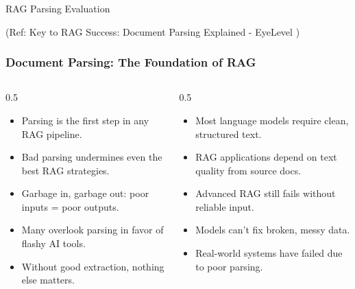 \begin{frame}[fragile]\frametitle{}
\begin{center}
{\Large RAG Parsing Evaluation}

{\tiny (Ref: Key to RAG Success: Document Parsing Explained - EyeLevel )}
\end{center}
\end{frame}

\begin{frame}[fragile]\frametitle{Document Parsing: The Foundation of RAG}

\begin{columns}
    \begin{column}[T]{0.5\linewidth}
	  \begin{itemize}
		\item Parsing is the first step in any RAG pipeline.
		\item Bad parsing undermines even the best RAG strategies.
		\item Garbage in, garbage out: poor inputs = poor outputs.
		\item Many overlook parsing in favor of flashy AI tools.
		\item Without good extraction, nothing else matters.
	  \end{itemize}

    \end{column}
    \begin{column}[T]{0.5\linewidth}
	  \begin{itemize}
		\item Most language models require clean, structured text.
		\item RAG applications depend on text quality from source docs.
		\item Advanced RAG still fails without reliable input.
		\item Models can't fix broken, messy data.
		\item Real-world systems have failed due to poor parsing.
	  \end{itemize}
    \end{column}
  \end{columns}
  

\end{frame}

